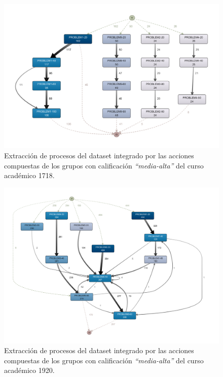 \begin{figure}[H]
    \centering
    \includegraphics[width=1.25\textwidth]{imagenes/DISCO_compound/Year1718MidHighGrades.png}
    \caption{Extracción de procesos del dataset integrado por las acciones compuestas de los grupos con calificación \emph{``media-alta''} del curso académico 1718.}
    \label{fig:year1718MidHighGrades}
\end{figure}

\begin{figure}[H]
    \centering
    \includegraphics[width=1.25\textwidth]{imagenes/DISCO_compound/Year1920MidHighGrades.png}
    \caption{Extracción de procesos del dataset integrado por las acciones compuestas de los grupos con calificación \emph{``media-alta''} del curso académico 1920.}
    \label{fig:year1920MidHighGrades}
\end{figure}

